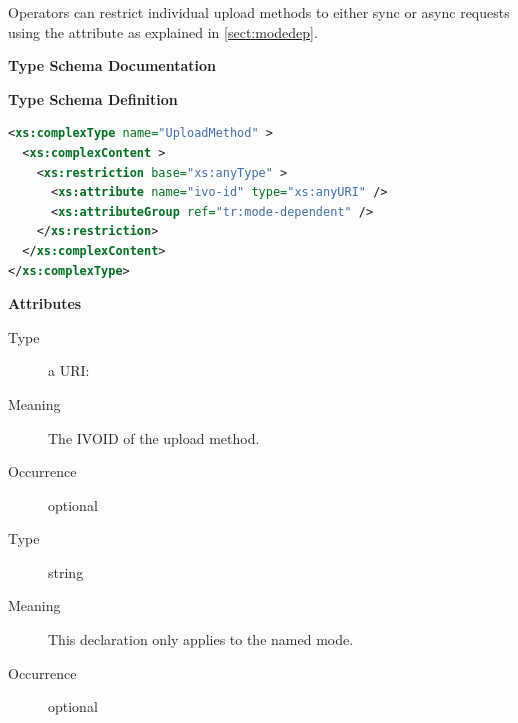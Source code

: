 \documentclass{ivoa}
\begin{document}
Operators can restrict individual upload methods to either sync or async
requests using the  attribute as explained in
\ref{sect:modedep}.

\begin{generated}
\begingroup
        \renewcommand*\descriptionlabel[1]{%
        \hbox to 5.5em{\emph{#1}\hfil}}\vspace{2ex}\noindent\textbf{ Type Schema Documentation}



\vspace{1ex}\noindent\textbf{ Type Schema Definition}

\begin{lstlisting}[language=XML,basicstyle=\footnotesize]
<xs:complexType name="UploadMethod" >
  <xs:complexContent >
    <xs:restriction base="xs:anyType" >
      <xs:attribute name="ivo-id" type="xs:anyURI" />
      <xs:attributeGroup ref="tr:mode-dependent" />
    </xs:restriction>
  </xs:complexContent>
</xs:complexType>
\end{lstlisting}

\vspace{0.5ex}\noindent\textbf{ Attributes}

\begingroup\small\begin{bigdescription}
\item[ivo-id]
\begin{description}
\item[Type] a URI: 
\item[Meaning] The IVOID of the upload method.
\item[Occurrence] optional
\end{description}

\item[forMode]
\begin{description}
\item[Type] string
\item[Meaning] This declaration only applies to the named mode.
\item[Occurrence] optional


\end{description}
\end{bigdescription}
\end{generated}
\end{document}
